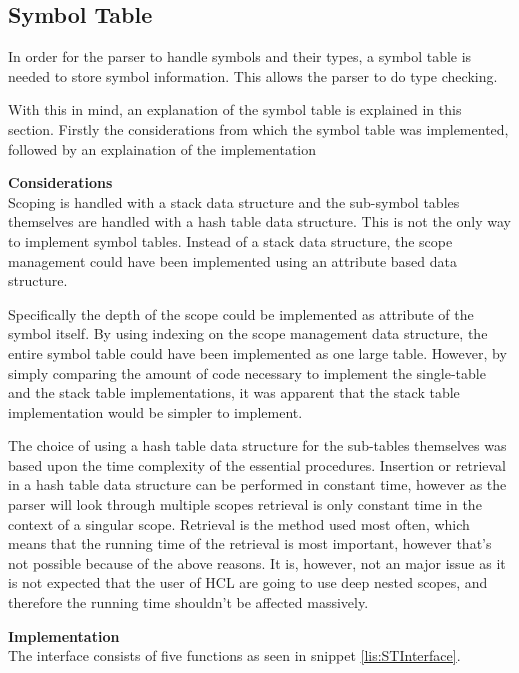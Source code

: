 \subsection{Symbol Table}
\label{sec:symbolTable}
In order for the parser to handle symbols and their types, a symbol table is needed to store symbol information.
This allows the parser to do type checking.

With this in mind, an explanation of the symbol table is explained in this section. 
Firstly the considerations from which the symbol table was implemented, followed by an explaination of the implementation

\textbf{Considerations}\\
Scoping is handled with a stack data structure and the sub-symbol tables themselves are handled with a hash table data structure.
This is not the only way to implement symbol tables.
Instead of a stack data structure, the scope management could have been implemented using an attribute based data structure.

Specifically the depth of the scope could be implemented as attribute of the symbol itself.
By using indexing on the scope management data structure, the entire symbol table could have been implemented as one large table.
However, by simply comparing the amount of code necessary to implement the single-table and the stack table implementations, it was apparent that the stack table implementation would be simpler to implement.

The choice of using a hash table data structure for the sub-tables themselves was based upon the time complexity of the essential procedures.
Insertion or retrieval in a hash table data structure can be performed in constant time, however as the parser will look through multiple scopes retrieval is only constant time in the context of a singular scope.
Retrieval is the method used most often, which means that the running time of the retrieval is most important, however that's not possible because of the above reasons. 
It is, however, not an major issue as it is not expected that the user of HCL are going to use deep nested scopes, and therefore the running time shouldn't be affected massively.



\textbf{Implementation}\\
The interface consists of five functions as seen in snippet \ref{lis:STInterface}.

